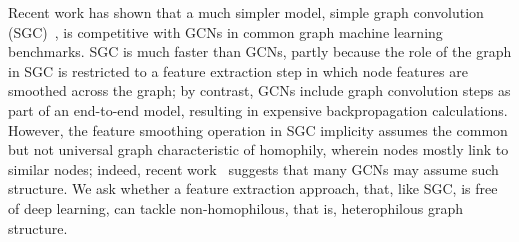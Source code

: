 \documentclass{article}
\begin{document}
Recent work has shown that a much simpler model, simple graph convolution (SGC)~\citep{wu2019simplifying}, is competitive with GCNs in common graph machine learning benchmarks. SGC is much faster than GCNs, partly because the role of the graph in SGC is restricted to a feature extraction step in which node features are smoothed across the graph; by contrast, GCNs include graph convolution steps as part of an end-to-end model, resulting in expensive backpropagation calculations. However, the feature smoothing operation in SGC implicity assumes the common but not universal graph characteristic of homophily, wherein nodes mostly link to similar nodes; indeed, recent work~\citep{nt2019revisiting} suggests that  many GCNs may assume such structure. We ask whether a feature extraction approach, that, like SGC, is free of deep learning, can tackle non-homophilous, that is, heterophilous graph structure.


\end{document}
